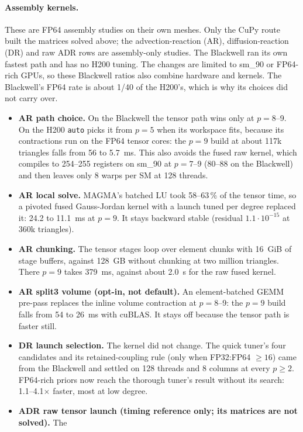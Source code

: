 \documentclass[10pt,a4paper]{article}
\begin{document}
\paragraph{Assembly kernels.}
These are FP64 assembly studies on their own meshes. Only the CuPy route built the matrices solved
above; the advection-reaction (AR), diffusion-reaction (DR) and raw ADR rows are assembly-only
studies. The Blackwell ran its own fastest path and has no H200 tuning. The changes are limited to
sm\_90 or FP64-rich GPUs, so these Blackwell ratios also combine hardware and kernels. The Blackwell's
FP64 rate is about 1/40 of the H200's, which is why its choices did not carry over.
\begin{itemize}
\item \textbf{AR path choice.} On the Blackwell the tensor path wins only at $p=8$--9. On the H200
  \texttt{auto} picks it from $p=5$ when its workspace fits, because its contractions run on the
  FP64 tensor cores: the $p=9$ build at about 117k triangles falls from 56 to 5.7~ms. This also
  avoids the fused raw kernel, which compiles to 254--255 registers on sm\_90 at $p=7$--9 (80--88 on
  the Blackwell) and then leaves only 8 warps per SM at 128 threads.
\item \textbf{AR local solve.} MAGMA's batched LU took 58--63\,\% of the tensor time, so a pivoted
  fused Gauss-Jordan kernel with a launch tuned per degree replaced it: 24.2 to 11.1~ms at $p=9$.
  It stays backward stable (residual $1.1\cdot10^{-15}$ at 360k triangles).
\item \textbf{AR chunking.} The tensor stages loop over element chunks with 16~GiB of stage buffers,
  against 128~GB without chunking at two million triangles. There $p=9$ takes 379~ms, against about
  2.0~s for the raw fused kernel.
\item \textbf{AR split3 volume (opt-in, not default).} An element-batched GEMM pre-pass replaces the
  inline volume contraction at $p=8$--9: the $p=9$ build falls from 54 to 26~ms with cuBLAS. It stays
  off because the tensor path is faster still.
\item \textbf{DR launch selection.} The kernel did not change. The quick tuner's four candidates and
  its retained-coupling rule (only when FP32:FP64 $\ge16$) came from the Blackwell and settled on 128
  threads and 8 columns at every $p\ge2$. FP64-rich priors now reach the thorough tuner's result
  without its search: 1.1--4.1$\times$ faster, most at low degree.
\item \textbf{ADR raw tensor launch (timing reference only; its matrices are not solved).} The

\end{itemize}
\end{document}
